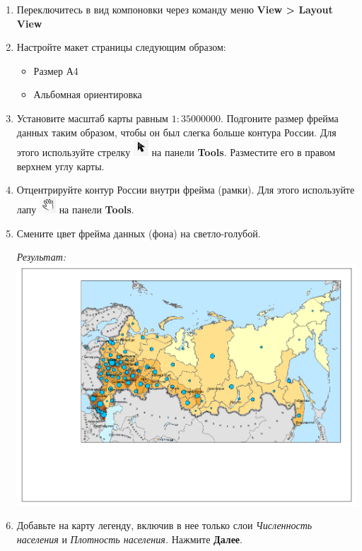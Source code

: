 \documentclass[]{book}
\providecommand{\tightlist}{%
  \setlength{\itemsep}{0pt}\setlength{\parskip}{0pt}}
\theoremstyle{definition}
\theoremstyle{definition}
\theoremstyle{definition}
\theoremstyle{remark}
\begin{document}
\begin{enumerate}
\def\labelenumi{\arabic{enumi}.}
\item
  Переключитесь в вид компоновки через команду меню \textbf{View
  \textgreater{} Layout View}
\item
  Настройте макет страницы следующим образом:

  \begin{itemize}
  \tightlist
  \item
    Размер А4
  \item
    Альбомная ориентировка
  \end{itemize}
\item
  Установите масштаб карты равным \(1:35 000 000\). Подгоните размер
  фрейма данных таким образом, чтобы он был слегка больше контура
  России. Для этого используйте стрелку
  \includegraphics{images/Ex04/image29.png} на панели \textbf{Tools}.
  Разместите его в правом верхнем углу карты.
\item
  Отцентрируйте контур России внутри фрейма (рамки). Для этого
  используйте лапу \includegraphics{images/Ex04/image30.png} на панели
  \textbf{Tools}.
\item
  Смените цвет фрейма данных (фона) на светло-голубой.

  \emph{Результат:} \includegraphics{images/Ex04/image31.png}
\item
  Добавьте на карту легенду, включив в нее только слои \emph{Численность
  населения} и \emph{Плотность населения.} Нажмите \textbf{Далее}.


\end{enumerate}
\end{document}
